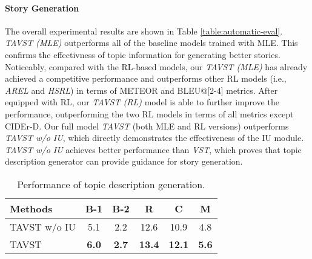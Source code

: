 \documentclass[11pt]{article}
\begin{document}
\paragraph{Story Generation}
The overall experimental results are shown in Table \ref{table:automatic-eval}. \emph{TAVST (MLE)} outperforms all of the baseline models trained with MLE. This confirms the effectivness of topic information for generating better stories. Noticeably, compared with the RL-based models, our \emph{TAVST (MLE)} has already achieved a competitive performance and outperforms other RL models (i.e., \emph{AREL} and \emph{HSRL}) in terms of METEOR and BLEU@[2-4] metrics. After equipped with RL, our \emph{TAVST (RL)} model is able to further improve the performance, outperforming the two RL models in terms of all metrics except CIDEr-D. Our full model \emph{TAVST} (both MLE and RL versions) outperforms \emph{TAVST w/o IU}, which directly demonstrates the effectiveness of the IU module. \emph{TAVST w/o IU} achieves better performance than \emph{VST}, which proves that topic description generator can provide guidance for story generation.


\begin{wraptable}{r}{0.52\textwidth}
	\centering
		\vspace{-3.5mm}

	\begin{tabular}{lccccc}
		\hline
		Methods &B-1&B-2&R&C&M\\
		\hline
        TAVST w/o IU   & 5.1 & 2.2 & 12.6 &10.9 &4.8 \\
		TAVST  & \textbf{6.0} &\textbf{2.7} &\textbf{13.4} & \textbf{12.1} & \textbf{5.6}\\
		\hline
	\end{tabular}
	\smallskip
	\vspace{-3mm}

	\caption{ Performance of topic description generation.}
	\label{table:topic}
	\vspace{-2mm}
\end{wraptable}
\end{document}
